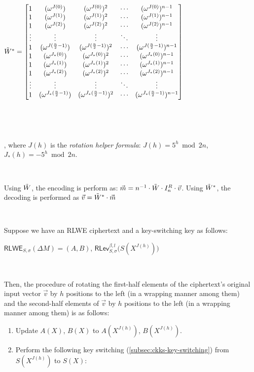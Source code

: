 \begin{tcolorbox}[title={\textbf{\tboxlabel{\ref*{subsec:bfv-rotation}} BFV's Homomorphic Rotation of Input Vector Slots}}]
$\tilde{W}^* = \begin{bmatrix}
1 & (\omega^{J(0)}) & (\omega^{J(0)})^2 & \cdots & (\omega^{J(0)})^{n-1}\\
1 & (\omega^{J(1)}) & (\omega^{J(1)})^2 & \cdots & (\omega^{J(1)})^{n-1}\\
1 & (\omega^{J(2)}) & (\omega^{J(2)})^2 & \cdots & (\omega^{J(2)})^{n-1}\\
\vdots & \vdots & \vdots & \ddots & \vdots \\
1 & (\omega^{J(\frac{n}{2}-1)}) & (\omega^{J(\frac{n}{2}-1)})^2 & \cdots & (\omega^{J(\frac{n}{2}-1)})^{n-1}\\
1 & (\omega^{J_*(0)}) & (\omega^{J_*(0)})^2 & \cdots & (\omega^{J_*(0)})^{n-1}\\
1 & (\omega^{J_*(1)}) & (\omega^{J_*(1)})^2 & \cdots & (\omega^{J_*(1)})^{n-1}\\
1 & (\omega^{J_*(2)}) & (\omega^{J_*(2)})^2 & \cdots & (\omega^{J_*(2)})^{n-1}\\
\vdots & \vdots & \vdots & \ddots & \vdots \\
1 & (\omega^{J_*(\frac{n}{2}-1)}) & (\omega^{J_*(\frac{n}{2}-1)})^2 & \cdots & (\omega^{J_*(\frac{n}{2}-1)})^{n-1}\\
\end{bmatrix}$

$ $

$ $

, where $J(h)$ is the \textit{rotation helper formula}: $J(h) = 5^h \bmod 2n$, 
\text{ } $J_*(h) = -5^h \bmod 2n$. 

$ $

Using $\tilde{W}$, the encoding is perform as: $\vec{m} = n^{-1}\cdot \tilde{W} \cdot I_n^R \cdot \vec{v}$. Using $\tilde{W}^*$, the decoding is performed as $\vec{v} = \tilde{W}^* \cdot \vec{m}$

$ $

Suppose we have an RLWE ciphertext and a key-switching key as follows:

$\textsf{RLWE}_{S, \sigma}(\Delta M) = (A, B)$, \text{ } $\textsf{RLev}_{S, \sigma}^{\beta, l}\bm(S(X^{J(h)})\bm)$

$ $

Then, the procedure of rotating the first-half elements of the ciphertext's original input vector $\vec{v}$ by $h$ positions to the left (in a wrapping manner among them) and the second-half elements of $\vec{v}$ by $h$ positions to the left (in a wrapping manner among them) is as follows: 

\begin{enumerate}
\item Update $A(X)$, $B(X)$ to $A(X^{J(h)})$, $B(X^{J(h)})$. 
\item Perform the following key switching (\autoref{subsec:ckks-key-switching}) from $S(X^{J(h)})$ to $S(X)$:


\end{enumerate}
\end{tcolorbox}
